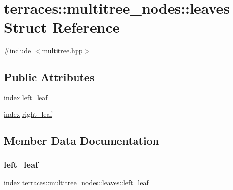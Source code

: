 \hypertarget{structterraces_1_1multitree__nodes_1_1leaves}{}\section{terraces\+:\+:multitree\+\_\+nodes\+:\+:leaves Struct Reference}
\label{structterraces_1_1multitree__nodes_1_1leaves}


{\ttfamily \#include $<$multitree.\+hpp$>$}

\subsection*{Public Attributes}
\begin{DoxyCompactItemize}
\item 
\hyperlink{namespaceterraces_adbc33ccb543d1634e96d0eb02e472c77}{index} \hyperlink{structterraces_1_1multitree__nodes_1_1leaves_ae5a944e1e6db1e1127c375f5f670f9cf}{left\+\_\+leaf}
\item 
\hyperlink{namespaceterraces_adbc33ccb543d1634e96d0eb02e472c77}{index} \hyperlink{structterraces_1_1multitree__nodes_1_1leaves_a0596c6b5bed8da9d5cb60fcf6133b75b}{right\+\_\+leaf}
\end{DoxyCompactItemize}


\subsection{Member Data Documentation}
\mbox{\label{structterraces_1_1multitree__nodes_1_1leaves_ae5a944e1e6db1e1127c375f5f670f9cf}} 
\subsubsection{\texorpdfstring{left\+\_\+leaf}{left\_leaf}}
{\footnotesize\ttfamily \hyperlink{namespaceterraces_adbc33ccb543d1634e96d0eb02e472c77}{index} terraces\+::multitree\+\_\+nodes\+::leaves\+::left\+\_\+leaf}

\mbox{\label{structterraces_1_1multitree__nodes_1_1leaves_a0596c6b5bed8da9d5cb60fcf6133b75b}} 
